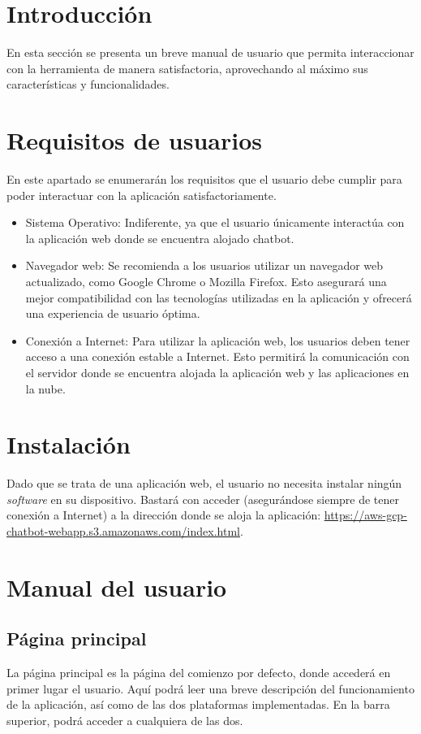 
\section{Introducción}
 En esta sección se presenta un breve manual de usuario que permita interaccionar con la herramienta de manera satisfactoria, aprovechando al máximo sus características y funcionalidades.

\section{Requisitos de usuarios}
 En este apartado se enumerarán los requisitos que el usuario debe cumplir para poder interactuar con la aplicación satisfactoriamente. 
\begin{itemize}
\tightlist
    \item Sistema Operativo: Indiferente, ya que el usuario únicamente interactúa con la aplicación web donde se encuentra alojado chatbot.
    \item Navegador web: Se recomienda a los usuarios utilizar un navegador web actualizado, como Google Chrome o Mozilla Firefox. Esto asegurará una mejor compatibilidad con las tecnologías utilizadas en la aplicación y ofrecerá una experiencia de usuario óptima.    
    \item Conexión a Internet: Para utilizar la aplicación web, los usuarios deben tener acceso a una conexión estable a Internet. Esto permitirá la comunicación con el servidor donde se encuentra alojada la aplicación web y las aplicaciones en la nube. 
\end{itemize}
 
\section{Instalación}
Dado que se trata de una aplicación web, el usuario no necesita instalar ningún \textit{software} en su dispositivo. Bastará con acceder (asegurándose siempre de tener conexión a Internet) a la dirección donde se aloja la aplicación: \url{https://aws-gcp-chatbot-webapp.s3.amazonaws.com/index.html}.
\section{Manual del usuario}

\subsection{Página principal}
La página principal es la página del comienzo por defecto, donde accederá en primer lugar el usuario. Aquí podrá leer una breve descripción del funcionamiento de la aplicación, así como de las dos plataformas implementadas. En la barra superior, podrá acceder a cualquiera de las dos.

